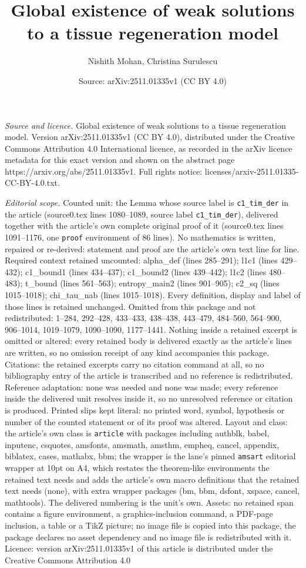 \documentclass[10pt,a4paper]{amsart}
\title[Global existence of weak solutions to a tissue regeneration ]{Global existence of weak solutions to a tissue regeneration model}
\author{Nishith Mohan, Christina Surulescu}
\date{Source: arXiv:2511.01335v1 (CC BY 4.0)}
\begin{document}
\maketitle

\noindent\emph{Source and licence.} Global existence of weak solutions to a tissue regeneration model. Version arXiv:2511.01335v1 (CC BY 4.0), distributed under the Creative Commons Attribution 4.0 International licence, as recorded in the arXiv licence metadata for this exact version and shown on the abstract page https://arxiv.org/abs/2511.01335v1. Full rights notice: licenses/arxiv-2511.01335-CC-BY-4.0.txt.\par\smallskip

\noindent\textit{Editorial scope.} Counted unit: the Lemma whose source label is \texttt{c1\_tim\_der} in the article (source0.tex lines 1080--1089, source label \texttt{c1\_tim\_der}), delivered together with the article's own complete original proof of it (source0.tex lines 1091--1176, one \texttt{proof} environment of 86 lines). No mathematics is written, repaired or re-derived: statement and proof are the article's own text line for line. Required context retained uncounted: alpha\_def (lines 285--291); l1c1 (lines 429--432); c1\_bound1 (lines 434--437); c1\_bound2 (lines 439--442); l1c2 (lines 480--483); t\_bound (lines 561--563); entropy\_main2 (lines 901--905); c2\_sq (lines 1015--1018); chi\_tau\_nab (lines 1015--1018). Every definition, display and label of those lines is retained unchanged. Omitted from this package and not redistributed: 1--284, 292--428, 433--433, 438--438, 443--479, 484--560, 564--900, 906--1014, 1019--1079, 1090--1090, 1177--1441. Nothing inside a retained excerpt is omitted or altered: every retained body is delivered exactly as the article's lines are written, so no omission receipt of any kind accompanies this package. Citations: the retained excerpts carry no citation command at all, so no bibliography entry of the article is transcribed and no reference is redistributed. Reference adaptation: none was needed and none was made; every reference inside the delivered unit resolves inside it, so no unresolved reference or citation is produced. Printed slips kept literal: no printed word, symbol, hypothesis or number of the counted statement or of its proof was altered. Layout and class: the article's own class is \texttt{article} with packages including authblk, babel, inputenc, csquotes, amsfonts, amsmath, amsthm, empheq, cancel, appendix, biblatex, cases, mathabx, bbm; the wrapper is the lane's pinned \texttt{amsart} editorial wrapper at 10pt on A4, which restates the theorem-like environments the retained text needs and adds the article's own macro definitions that the retained text needs (none), with extra wrapper packages (bm, bbm, dsfont, xspace, cancel, mathtools). The delivered numbering is the unit's own. Assets: no retained span contains a figure environment, a graphics-inclusion command, a PDF-page inclusion, a table or a TikZ picture; no image file is copied into this package, the package declares no asset dependency and no image file is redistributed with it. Licence: version arXiv:2511.01335v1 of this article is distributed under the Creative Commons Attribution 4.0 
\end{document}
